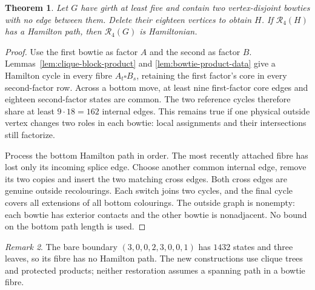 \documentclass[11pt]{article}
\newtheorem{theorem}{Theorem}[section]
\theoremstyle{remark}
\newtheorem{remark}[theorem]{Remark}
\newcommand{\R}{\mathcal R}
\numberwithin{equation}{section}
\numberwithin{table}{section}
\begin{document}
\begin{theorem}\label{thm:paired-bowties}
Let $G$ have girth at least five and contain two vertex-disjoint bowties
with no edge between them. Delete their eighteen vertices to obtain $H$.
If $\R_4(H)$ has a Hamilton path, then $\R_4(G)$ is Hamiltonian.
\end{theorem}
\begin{proof}
Use the first bowtie as factor $A$ and the second as factor $B$.
Lemmas~\ref{lem:clique-block-product} and \ref{lem:bowtie-product-data}
give a Hamilton cycle in every fibre $A_t\square B_s$, retaining the
first factor's core in every second-factor row. Across a bottom move,
at least nine first-factor core edges and eighteen second-factor states
are common. The two reference cycles therefore share at least
$9\cdot18=162$ internal edges. This remains true if one physical
outside vertex changes two roles in each bowtie: local assignments and
their intersections still factorize.

Process the bottom Hamilton path in order. The most recently attached
fibre has lost only its incoming splice edge. Choose another common
internal edge, remove its two copies and insert the two matching cross
edges. Both cross edges are genuine outside recolourings. Each switch
joins two cycles, and the final cycle covers all extensions of all bottom
colourings. The outside graph is nonempty: each bowtie has exterior
contacts and the other bowtie is nonadjacent. No bound on the bottom
path length is used.
\end{proof}

\begin{remark}
The bare boundary $(3,0,0,2,3,0,0,1)$ has $1432$ states and three leaves,
so its fibre has no Hamilton path. The new constructions use clique trees
and protected products; neither restoration assumes a spanning path in
a bowtie fibre.
\end{remark}
\end{document}
